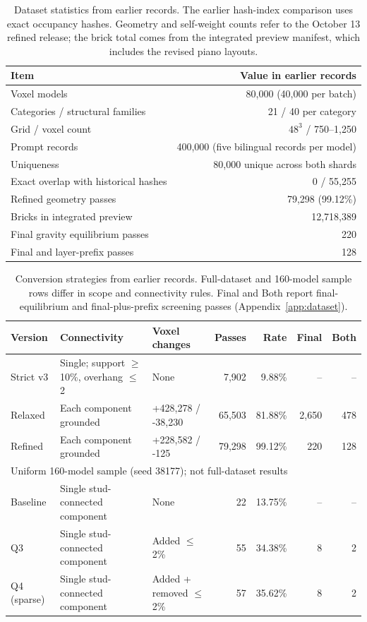 \begin{table}[!htbp]\centering\small
\begin{tabular}{lr}\toprule
Item & Value in earlier records \\ \midrule
Voxel models & 80,000 (40,000 per batch) \\
Categories / structural families & 21 / 40 per category \\
Grid / voxel count & $48^3$ / 750--1,250 \\
Prompt records & 400,000 (five bilingual records per model) \\
Uniqueness & 80,000 unique across both shards \\
Exact overlap with historical hashes & 0 / 55,255 \\
Refined geometry passes & 79,298 (99.12\%) \\
Bricks in integrated preview & 12,718,389 \\
Final gravity equilibrium passes & 220 \\
Final and layer-prefix passes & 128 \\
\bottomrule\end{tabular}
\caption{Dataset statistics from earlier records. The earlier hash-index comparison uses exact occupancy hashes. Geometry and self-weight counts refer to the October 13 refined release; the brick total comes from the integrated preview manifest, which includes the revised piano layouts.}
\end{table}

\begin{table}[!htbp]\centering\small
\setlength{\tabcolsep}{3pt}
\begin{tabular}{@{}l>{\raggedright\arraybackslash}p{3.9cm}>{\raggedright\arraybackslash}p{2.5cm}rrrr@{}}\toprule
Version & Connectivity & Voxel changes & Passes & Rate & Final & Both \\ \midrule
Strict v3 & Single; support $\geq$10\%, overhang $\leq$2 & None & 7,902 & 9.88\% & -- & -- \\
Relaxed & Each component grounded & +428,278 / -38,230 & 65,503 & 81.88\% & 2,650 & 478 \\
Refined & Each component grounded & +228,582 / -125 & 79,298 & 99.12\% & 220 & 128 \\
\midrule
\multicolumn{7}{l}{Uniform 160-model sample (seed 38177); not full-dataset results} \\
Baseline & Single stud-connected component & None & 22 & 13.75\% & -- & -- \\
Q3 & Single stud-connected component & Added $\leq$2\% & 55 & 34.38\% & 8 & 2 \\
Q4 (sparse) & Single stud-connected component & Added + removed $\leq$2\% & 57 & 35.62\% & 8 & 2 \\
\bottomrule\end{tabular}
\caption{Conversion strategies from earlier records. Full-dataset and 160-model sample rows differ in scope and connectivity rules. Final and Both report final-equilibrium and final-plus-prefix screening passes (Appendix~\ref{app:dataset}).}
\end{table}

